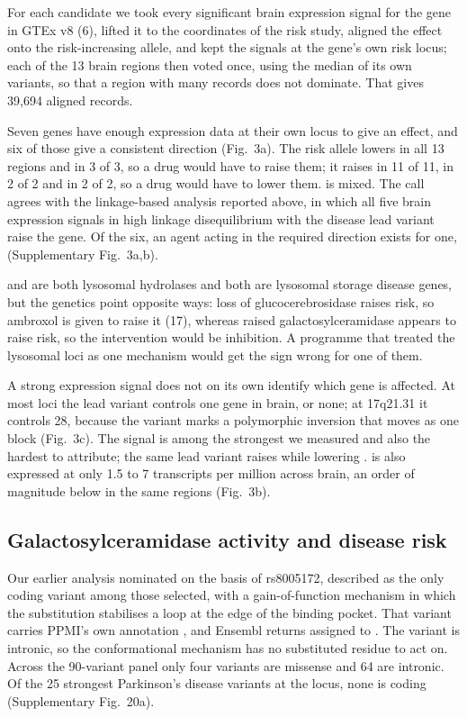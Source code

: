 \documentclass[10pt]{article}
\begin{document}
For each candidate we took every significant brain expression signal for the gene in GTEx v8 (6), lifted it to the coordinates of the risk study, aligned the
effect onto the risk-increasing allele, and kept the signals at the gene's own risk locus; each of
the 13 brain regions then voted once, using the median of its own variants, so that a region with many records does not dominate. That gives 39,694 aligned
records.

Seven genes have enough expression data at their own locus to give an effect, and six of those give a consistent direction (Fig.~3a). The risk allele lowers  in all 13 regions and
 in 3 of 3, so a drug would have to raise them; it raises  in 11 of 11,
 in 2 of 2 and  in 2 of 2, so a drug would have to lower them.  is
mixed. The  call agrees with the linkage-based analysis reported above, in which all
five brain expression signals in high linkage disequilibrium with the disease lead variant raise
the gene. Of the six, an agent acting in the required direction exists for one, 
(Supplementary Fig.~3a,b).

 and  are both lysosomal
hydrolases and both are lysosomal storage disease genes, but the genetics point opposite ways:
loss of glucocerebrosidase raises risk, so ambroxol is given to raise it (17), whereas raised
galactosylceramidase appears to raise risk, so the intervention would be inhibition. A programme
that treated the lysosomal loci as one mechanism would get the sign wrong for one of them.

A strong expression signal does not on its own identify which gene is affected. At most
loci the lead variant controls one gene in brain, or none; at 17q21.31 it
controls 28, because the variant marks a polymorphic inversion that moves as one
block (Fig.~3c). The  signal is among the strongest we measured and also the hardest to attribute; the same lead variant raises  while lowering .  is also expressed at only 1.5 to 7 transcripts per million across brain, an order of magnitude below  in the same regions (Fig.~3b).

\subsection*{Galactosylceramidase activity and disease risk}

Our earlier analysis nominated  on the basis of rs8005172, described as the only
coding variant among those selected, with a gain-of-function mechanism in which the substitution
stabilises a loop at the edge of the binding pocket. That variant carries PPMI's own annotation
, and Ensembl returns  assigned to . The variant is intronic, so the conformational mechanism has no substituted residue to act on. Across the 90-variant panel only four variants are missense and 64 are intronic. Of the
25 strongest Parkinson's disease variants at the  locus, none is coding (Supplementary Fig.~20a).
\end{document}
